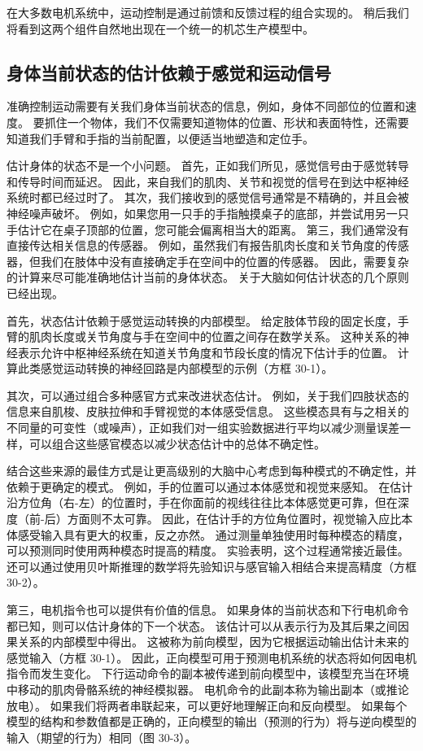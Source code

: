 在大多数电机系统中，运动控制是通过前馈和反馈过程的组合实现的。 稍后我们将看到这两个组件自然地出现在一个统一的机芯生产模型中。


\subsection{身体当前状态的估计依赖于感觉和运动信号}

准确控制运动需要有关我们身体当前状态的信息，例如，身体不同部位的位置和速度。 要抓住一个物体，我们不仅需要知道物体的位置、形状和表面特性，还需要知道我们手臂和手指的当前配置，以便适当地塑造和定位手。

估计身体的状态不是一个小问题。 首先，正如我们所见，感觉信号由于感觉转导和传导时间而延迟。 因此，来自我们的肌肉、关节和视觉的信号在到达中枢神经系统时都已经过时了。 其次，我们接收到的感觉信号通常是不精确的，并且会被神经噪声破坏。 例如，如果您用一只手的手指触摸桌子的底部，并尝试用另一只手估计它在桌子顶部的位置，您可能会偏离相当大的距离。 第三，我们通常没有直接传达相关信息的传感器。 例如，虽然我们有报告肌肉长度和关节角度的传感器，但我们在肢体中没有直接确定手在空间中的位置的传感器。 因此，需要复杂的计算来尽可能准确地估计当前的身体状态。 关于大脑如何估计状态的几个原则已经出现。

首先，状态估计依赖于感觉运动转换的内部模型。 给定肢体节段的固定长度，手臂的肌肉长度或关节角度与手在空间中的位置之间存在数学关系。 这种关系的神经表示允许中枢神经系统在知道关节角度和节段长度的情况下估计手的位置。 计算此类感觉运动转换的神经回路是内部模型的示例（方框 30-1）。

其次，可以通过组合多种感官方式来改进状态估计。 例如，关于我们四肢状态的信息来自肌梭、皮肤拉伸和手臂视觉的本体感受信息。 这些模态具有与之相关的不同量的可变性（或噪声），正如我们对一组实验数据进行平均以减少测量误差一样，可以组合这些感官模态以减少状态估计中的总体不确定性。

结合这些来源的最佳方式是让更高级别的大脑中心考虑到每种模式的不确定性，并依赖于更确定的模式。 例如，手的位置可以通过本体感觉和视觉来感知。 在估计沿方位角（右-左）的位置时，手在你面前的视线往往比本体感觉更可靠，但在深度（前-后）方面则不太可靠。 因此，在估计手的方位角位置时，视觉输入应比本体感受输入具有更大的权重，反之亦然。 通过测量单独使用时每种模态的精度，可以预测同时使用两种模态时提高的精度。 实验表明，这个过程通常接近最佳。 还可以通过使用贝叶斯推理的数学将先验知识与感官输入相结合来提高精度（方框 30-2）。

第三，电机指令也可以提供有价值的信息。 如果身体的当前状态和下行电机命令都已知，则可以估计身体的下一个状态。 该估计可以从表示行为及其后果之间因果关系的内部模型中得出。 这被称为前向模型，因为它根据运动输出估计未来的感觉输入（方框 30-1）。 因此，正向模型可用于预测电机系统的状态将如何因电机指令而发生变化。 下行运动命令的副本被传递到前向模型中，该模型充当在环境中移动的肌肉骨骼系统的神经模拟器。 电机命令的此副本称为输出副本（或推论放电）。 如果我们将两者串联起来，可以更好地理解正向和反向模型。 如果每个模型的结构和参数值都是正确的，正向模型的输出（预测的行为）将与逆向模型的输入（期望的行为）相同（图 30-3）。

